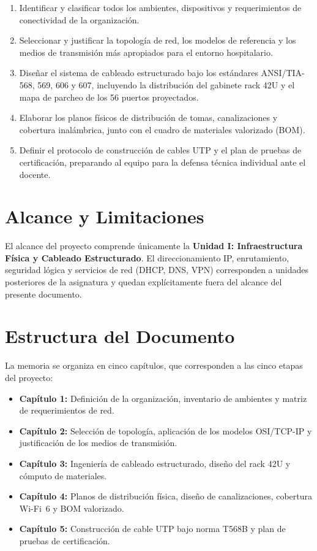 \begin{enumerate}[leftmargin=*, label=\arabic*.]
    \item Identificar y clasificar todos los ambientes, dispositivos y requerimientos de conectividad de la organización.
    \item Seleccionar y justificar la topología de red, los modelos de referencia y los medios de transmisión más apropiados para el entorno hospitalario.
    \item Diseñar el sistema de cableado estructurado bajo los estándares ANSI/TIA-568, 569, 606 y 607, incluyendo la distribución del gabinete rack 42U y el mapa de parcheo de los 56 puertos proyectados.
    \item Elaborar los planos físicos de distribución de tomas, canalizaciones y cobertura inalámbrica, junto con el cuadro de materiales valorizado (BOM).
    \item Definir el protocolo de construcción de cables UTP y el plan de pruebas de certificación, preparando al equipo para la defensa técnica individual ante el docente.
\end{enumerate}

\section*{Alcance y Limitaciones}

El alcance del proyecto comprende únicamente la \textbf{Unidad I: Infraestructura Física y Cableado Estructurado}. El direccionamiento IP, enrutamiento, seguridad lógica y servicios de red (DHCP, DNS, VPN) corresponden a unidades posteriores de la asignatura y quedan explícitamente fuera del alcance del presente documento.

\section*{Estructura del Documento}

La memoria se organiza en cinco capítulos, que corresponden a las cinco etapas del proyecto:

\begin{itemize}[leftmargin=*]
    \item \textbf{Capítulo 1:} Definición de la organización, inventario de ambientes y matriz de requerimientos de red.
    \item \textbf{Capítulo 2:} Selección de topología, aplicación de los modelos OSI/TCP-IP y justificación de los medios de transmisión.
    \item \textbf{Capítulo 3:} Ingeniería de cableado estructurado, diseño del rack 42U y cómputo de materiales.
    \item \textbf{Capítulo 4:} Planos de distribución física, diseño de canalizaciones, cobertura Wi-Fi~6 y BOM valorizado.
    \item \textbf{Capítulo 5:} Construcción de cable UTP bajo norma T568B y plan de pruebas de certificación.
\end{itemize}
